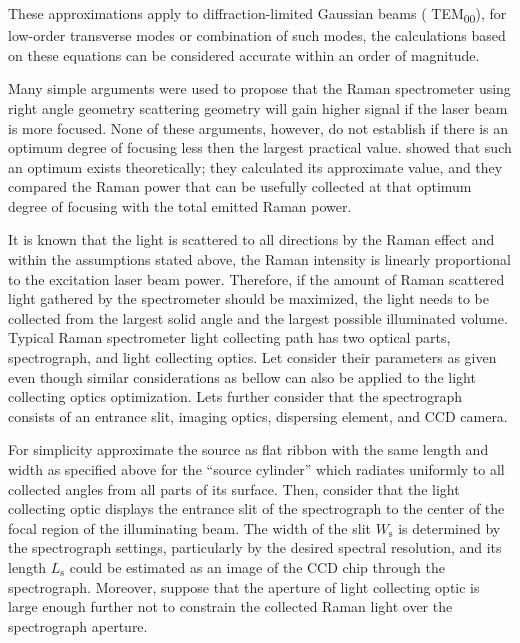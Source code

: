 These approximations apply to diffraction-limited Gaussian beams (
TEM\textsubscript{00}), for low-order transverse modes or combination of such
modes, the calculations based on these equations can be considered accurate
within an order of magnitude.

Many simple arguments \parencite{Atwood1963,Barrett1968} were used to propose
that the Raman spectrometer using right angle geometry scattering geometry
will gain higher signal if the laser beam is more focused. None of these
arguments, however, do not establish if there is an optimum degree of
focusing less then the largest practical value. \textcite{Barrett1968} showed
that such an optimum exists theoretically; they calculated its approximate
value, and they compared the Raman power that can be usefully collected at
that optimum degree of focusing with the total emitted Raman power.

It is known that the light is scattered to all directions by the Raman effect
and within the assumptions stated above, the Raman intensity is linearly
proportional to the excitation laser beam power. Therefore, if the amount of
Raman scattered light gathered by the spectrometer should be maximized, the
light needs to be collected from the largest solid angle and the largest
possible illuminated volume. Typical Raman spectrometer light collecting path
has two optical parts, spectrograph, and light collecting optics. Let
consider their parameters as given even though similar considerations as
bellow can also be applied to the light collecting optics optimization. Lets
further consider that the spectrograph consists of an entrance slit, imaging
optics, dispersing element, and CCD camera.

For simplicity approximate the source as flat ribbon with the same length and
width as specified above for the “source cylinder” which radiates uniformly
to all collected angles from all parts of its surface. Then, consider that
the light collecting optic displays the entrance slit of the spectrograph to
the center of the focal region of the illuminating beam. The width of the
slit $W_\mathrm{s}$ is determined by the spectrograph settings, particularly
by the desired spectral resolution, and its length $L_\mathrm{s}$ could be
estimated as an image of the CCD chip through the spectrograph. Moreover,
suppose that the aperture of light collecting optic is large enough further
not to constrain the collected Raman light over the spectrograph aperture.

